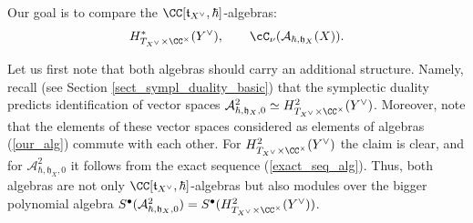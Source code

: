 \documentclass[12pt]{amsart}
\begin{document}
	
Our goal is to compare the $\CC[\mathfrak{t}_{X^\vee},\hbar]$-algebras: 
\begin{equation}\label{our_alg}
H^*_{T_{X^\vee} \times \CC^\times}(Y^\vee), \qquad \cC_\nu(\mathcal{A}_{\hbar,\mathfrak{h}_{X}}(X)).
\end{equation}

Let us first note that both algebras should carry an additional structure. Namely, recall (see Section \ref{sect_sympl_duality_basic}) that the symplectic duality predicts identification of vector spaces $\mathcal{A}^2_{\hbar,\mathfrak{h}_{X},0} \simeq H^2_{T_{X^\vee}\times \CC^\times}(Y^\vee)$. 
Moreover, note that the elements of these vector spaces considered as elements of algebras (\ref{our_alg}) commute with each other. For $H^2_{T_{X^\vee}\times \CC^\times}(Y^\vee)$ the claim is clear, and for $\mathcal{A}^2_{\hbar,\mathfrak{h}_{X},0}$ it follows from the exact sequence (\ref{exact_seq_alg}). Thus, both algebras are not only $\CC[\mathfrak{t}_{X^\vee},\hbar]$-algebras but also modules over the bigger polynomial algebra $S^{\bullet}(\mathcal{A}^2_{\hbar,\mathfrak{h}_{X},0})=S^{\bullet}(H^2_{T_{X^\vee}\times \CC^\times}(Y^\vee))$. 
\end{document}
